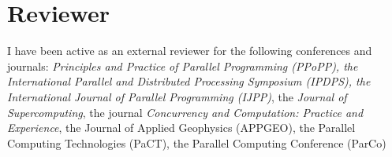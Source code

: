 \documentclass[11pt,a4paper]{moderncv}
\begin{document}
\section{Reviewer}

				 {I have been active as an external reviewer for the following conferences and journals:
                  \emph{Principles and Practice of Parallel Programming (PPoPP),
                    the International Parallel and Distributed Processing Symposium (IPDPS),
                    the International Journal of Parallel Programming (IJPP)},
					the \emph{Journal of Supercomputing},
					the journal \emph{Concurrency and Computation: Practice and Experience},
                    the Journal of Applied Geophysics (APPGEO),
					the Parallel Computing Technologies (PaCT),
					the Parallel Computing Conference (ParCo)
				 }
\end{document}
